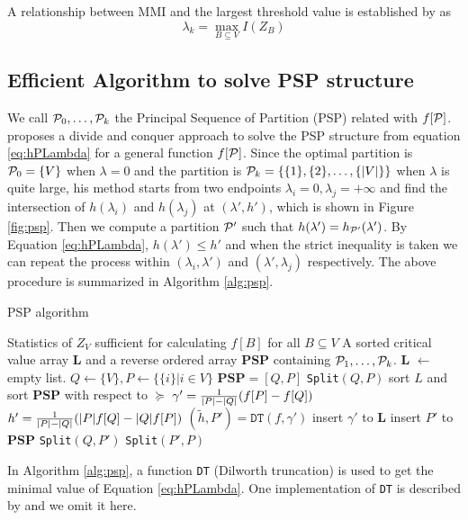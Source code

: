 A relationship between MMI and the largest threshold value is established by \citet{agg_ic} as 
\begin{equation}\label{eq:largest_threshold}
\lambda_k = \max_{B\subseteq V} I(Z_B)
\end{equation}
\subsection{Efficient Algorithm to solve PSP structure}
We call $\P_0, \dots, \P_k$ the Principal Sequence of Partition (PSP) related with $f[\P]$.
\cite{narayanan} proposes a divide and conquer approach to solve the PSP structure from equation \eqref{eq:hPLambda} for a general function $f[\P]$.
Since the optimal partition is $\P_0 = \{V\}$ when $\lambda=0$ and the partition is $\P_k=\{\{1\}, \{2\}, \dots, \{|V|\}\}$ when $\lambda$ is quite large,
his method starts from two endpoints $\lambda_i = 0, \lambda_j = +\infty$ and find the intersection of 
$h(\lambda_i)$ and $h(\lambda_j)$ at $(\lambda', h')$, which is shown in Figure \ref{fig:psp}. Then we compute a partition $\P'$ such that $h(\lambda') = h_{\P'}(\lambda')$. By Equation \eqref{eq:hPLambda}, $h(\lambda') \leq h'$ and when the strict inequality is taken we can repeat the process within $(\lambda_i, \lambda')$ and $(\lambda', \lambda_j)$ respectively. The above procedure is summarized in Algorithm \ref{alg:psp}.

\begin{algorithm}
\caption{PSP algorithm}\label{alg:psp}
\begin{algorithmic}[1]
\REQUIRE Statistics of $Z_V$ sufficient for calculating $f[B]$ for all $B \subseteq V$
\ENSURE A sorted critical value array \textbf{L} and a reverse ordered array \textbf{PSP} containing $\P_1,\dots, \P_k$.
\STATE \textbf{L}  $\leftarrow$ empty list.
\STATE $Q\leftarrow \{V\}, P \leftarrow \{ \{i \} | i \in V\}$
\STATE $\mathbf{PSP}= [Q, P]$
\STATE \texttt{Split}$(Q,P)$
\STATE sort $L$ and sort $\mathbf{PSP}$ with respect to $\succeq$ 
 \STATE\label{alg:gamma} $\gamma' = {1 \over \abs{P} - \abs{Q}} (f[P]-f[Q])$
 \STATE $h' = {1 \over \abs{P} - \abs{Q}}(\abs{P} f[Q] - \abs{Q} f[P])$
 \STATE $(\tilde{h}, P') = \texttt{DT}(f,\gamma')$ \footnotemark
 	\STATE\label{line:11} insert $\gamma'$ to $\mathbf{L}$
 \ELSE
 	\STATE insert $P'$ to $\mathbf{PSP}$
 	\STATE \texttt{Split}$(Q, P')$
 	\STATE \texttt{Split}$(P',P)$
 \ENDIF
\ENDFUNCTION
\end{algorithmic}
\end{algorithm}
In Algorithm \ref{alg:psp}, a function \texttt{DT} (Dilworth truncation) is used to get the minimal value of Equation \eqref{eq:hPLambda}.
One implementation of \texttt{DT} is described by \cite{mac} and we omit it here.


